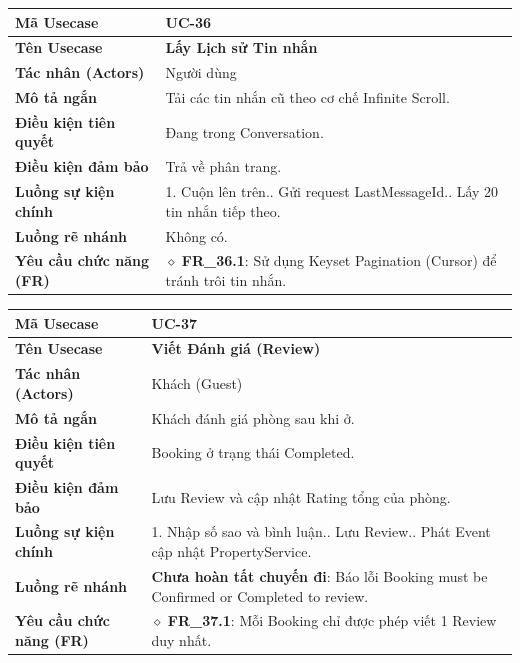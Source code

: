 \begin{table}[H]
\renewcommand{\arraystretch}{1.3}
\centering
\begin{tabularx}{\textwidth}{|p{4.5cm}|X|}
\hline
\cellcolor{gray!15}\bfseries Mã Usecase & \textbf{UC-36} \\ \hline
\cellcolor{gray!15}\bfseries Tên Usecase & \textbf{Lấy Lịch sử Tin nhắn} \\ \hline
\cellcolor{gray!15}\bfseries Tác nhân (Actors) & Người dùng \\ \hline
\cellcolor{gray!15}\bfseries Mô tả ngắn & Tải các tin nhắn cũ theo cơ chế Infinite Scroll. \\ \hline
\cellcolor{gray!15}\bfseries Điều kiện tiên quyết & Đang trong Conversation. \\ \hline
\cellcolor{gray!15}\bfseries Điều kiện đảm bảo & Trả về phân trang. \\ \hline
\cellcolor{gray!15}\bfseries Luồng sự kiện chính & 1. Cuộn lên trên.\newline 2. Gửi request LastMessageId.\newline 3. Lấy 20 tin nhắn tiếp theo. \\ \hline
\cellcolor{gray!15}\bfseries Luồng rẽ nhánh & Không có. \\ \hline
\cellcolor{gray!15}\bfseries Yêu cầu chức năng (FR) & $\diamond$ \textbf{FR\_36.1}: Sử dụng Keyset Pagination (Cursor) để tránh trôi tin nhắn. \\ \hline
\end{tabularx}
\end{table}

\begin{table}[H]
\renewcommand{\arraystretch}{1.3}
\centering
\begin{tabularx}{\textwidth}{|p{4.5cm}|X|}
\hline
\cellcolor{gray!15}\bfseries Mã Usecase & \textbf{UC-37} \\ \hline
\cellcolor{gray!15}\bfseries Tên Usecase & \textbf{Viết Đánh giá (Review)} \\ \hline
\cellcolor{gray!15}\bfseries Tác nhân (Actors) & Khách (Guest) \\ \hline
\cellcolor{gray!15}\bfseries Mô tả ngắn & Khách đánh giá phòng sau khi ở. \\ \hline
\cellcolor{gray!15}\bfseries Điều kiện tiên quyết & Booking ở trạng thái Completed. \\ \hline
\cellcolor{gray!15}\bfseries Điều kiện đảm bảo & Lưu Review và cập nhật Rating tổng của phòng. \\ \hline
\cellcolor{gray!15}\bfseries Luồng sự kiện chính & 1. Nhập số sao và bình luận.\newline 2. Lưu Review.\newline 3. Phát Event cập nhật PropertyService. \\ \hline
\cellcolor{gray!15}\bfseries Luồng rẽ nhánh & \textbf{Chưa hoàn tất chuyến đi}: Báo lỗi Booking must be Confirmed or Completed to review. \\ \hline
\cellcolor{gray!15}\bfseries Yêu cầu chức năng (FR) & $\diamond$ \textbf{FR\_37.1}: Mỗi Booking chỉ được phép viết 1 Review duy nhất. \\ \hline
\end{tabularx}
\end{table}

